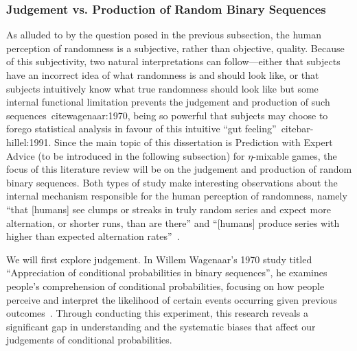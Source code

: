 \subsubsection{Judgement vs. Production of Random Binary Sequences}
As alluded to by the question posed in the previous subsection, the human perception of randomness is a subjective, rather than objective, quality. Because of this subjectivity, two natural interpretations can follow—either that subjects have an incorrect idea of what randomness is and should look like, or that subjects intuitively know what true randomness should look like but some internal functional limitation prevents the judgement and production of such sequences~cite{wagenaar:1970}, being so powerful that subjects may choose to forego statistical analysis in favour of this intuitive ``gut feeling''~cite{bar-hillel:1991}. Since the main topic of this dissertation is Prediction with Expert Advice (to be introduced in the following subsection) for $\eta$-mixable games, the focus of this literature review will be on the judgement and production of random binary sequences. Both types of study make interesting observations about the internal mechanism responsible for the human perception of randomness, namely ``that [humans] see clumps or streaks in truly random series and expect more alternation, or shorter runs, than are there'' and ``[humans] produce series with higher than expected alternation rates''~\cite{bar-hillel:1991}.

We will first explore judgement. In Willem Wagenaar's 1970 study titled ``Appreciation of conditional probabilities in binary sequences'', he examines people's comprehension of conditional probabilities, focusing on how people perceive and interpret the likelihood of certain events occurring given previous outcomes~\cite{wagenaar:1970}. Through conducting this experiment, this research reveals a significant gap in understanding and the systematic biases that affect our judgements of conditional probabilities.


